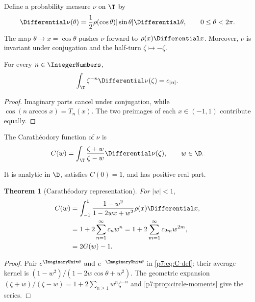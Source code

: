\documentclass[11pt]{article}
\newtheorem{theorem}{Theorem}[section]
\theoremstyle{definition}
\theoremstyle{remark}
\begin{document}
Define a probability measure \(\nu\) on \(\T\) by
\begin{equation}
 \Differential\nu(\theta)=\frac12\rho(\cos\theta)|\sin\theta|\Differential\theta,
 \qquad 0\le\theta<2\pi.
 \label{p7:eq:circle-lift}
\end{equation}
The map \(\theta\mapsto x=\cos\theta\) pushes \(\nu\) forward to \(\rho(x)\Differential x\). Moreover,
\(\nu\) is invariant under conjugation and the half-turn \(\zeta\mapsto-\zeta\).

\begin{proposition}
\label{p7:prop:circle-moments}
For every \(n\in\IntegerNumbers\),
\begin{equation}
 \int_{\T}\zeta^{-n}\Differential\nu(\zeta)=c_{|n|}.
 \label{p7:eq:nu-moments}
\end{equation}
\end{proposition}

\begin{proof}
Imaginary parts cancel under conjugation, while
\(\cos(n\arccos x)=T_n(x)\). The two preimages of each \(x\in(-1,1)\) contribute equally.
\end{proof}

\begin{definition}
The Carath\'eodory function of \(\nu\) is
\begin{equation}
 C(w)=\int_{\T}\frac{\zeta+w}{\zeta-w}\Differential\nu(\zeta),
 \qquad w\in\D.
 \label{p7:eq:C-def}
\end{equation}
\end{definition}
It is analytic in \(\D\), satisfies \(C(0)=1\), and has positive real part.

\begin{theorem}[Carath\'eodory representation]
\label{p7:thm:C-representation}
For \(|w|<1\),
\begin{align}
 C(w)
 &=\int_{-1}^{1}\frac{1-w^2}{1-2wx+w^2}\rho(x)\Differential x,
 \label{p7:eq:C-real-integral}\\
 &=1+2\sum_{n=1}^{\infty}c_nw^n
 =1+2\sum_{m=1}^{\infty}c_{2m}w^{2m},
 \label{p7:eq:C-series}\\
 &=2G(w)-1.
 \label{p7:eq:C-G}
\end{align}
\end{theorem}

\begin{proof}
Pair \(e^{\ImaginaryUnit\theta}\) and \(e^{-\ImaginaryUnit\theta}\) in \eqref{p7:eq:C-def}; their average kernel is
\((1-w^2)/(1-2w\cos\theta+w^2)\). The geometric expansion
\((\zeta+w)/(\zeta-w)=1+2\sum_{n\ge1}w^n\zeta^{-n}\) and
\cref{p7:prop:circle-moments} give the series.
\end{proof}
\end{document}
